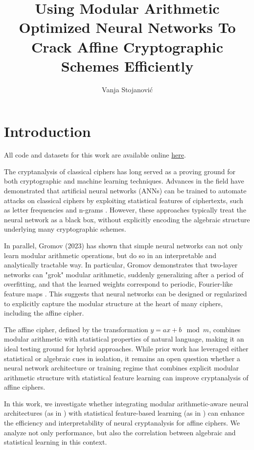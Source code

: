 \documentclass[manuscript,screen,acmtog,natbib=false]{acmart}
\title{Using Modular Arithmetic Optimized Neural Networks To
Crack Affine Cryptographic Schemes Efficiently}
\author{Vanja Stojanović}
\affiliation{
    \institution{University of Ljubljana}
    \department{Faculty of Mathematics and Physics}
    \city{Ljubljana}
    \country{Slovenia}
}
\begin{document}
  \maketitle

  \section{Introduction}

  All code and datasets for this work are available online \href{https://github.com/Vanja-S/Differentiable-Programming/tree/main/Research%20Project/Project/python}{here}.

  The cryptanalysis of classical ciphers has long served as a proving ground for both cryptographic
  and machine learning techniques. Advances in the field have demonstrated that artificial neural networks
  (ANNs) can be trained to automate attacks on classical ciphers by exploiting statistical features of
  ciphertexts, such as letter frequencies and n-grams \cite{Focardi2018NeuralCO}. However, these approaches
  typically treat the neural network as a black box, without explicitly encoding the algebraic structure
  underlying many cryptographic schemes.

  In parallel, Gromov (2023) has shown that simple neural networks can not only learn modular arithmetic operations,
  but do so in an interpretable and analytically tractable way. In particular, Gromov demonstrates that two-layer
  networks can "grok" modular arithmetic, suddenly generalizing after a period of overfitting, and that the
  learned weights correspond to periodic, Fourier-like feature maps \cite{gromov2023}. This suggests that neural
  networks can be designed or regularized to explicitly capture the modular structure at the heart of many ciphers,
  including the affine cipher.

  The affine cipher, defined by the transformation \(y = a x + b \mod m\), combines modular arithmetic with statistical
  properties of natural language, making it an ideal testing ground for hybrid approaches. While prior work has leveraged
  either statistical or algebraic cues in isolation, it remains an open question whether a neural network architecture
  or training regime that combines explicit modular arithmetic structure with statistical feature learning can improve
  cryptanalysis of affine ciphers.

  In this work, we investigate whether integrating modular arith\-metic-aware neural architectures (as in \cite{gromov2023})
  with statistical feature-based learning (as in \cite{Focardi2018NeuralCO}) can enhance the efficiency and
  interpretability of neural cryptanalysis for affine ciphers. We analyze not only performance, but also the 
  correlation between algebraic and statistical learning in this context.
  
\end{document}
